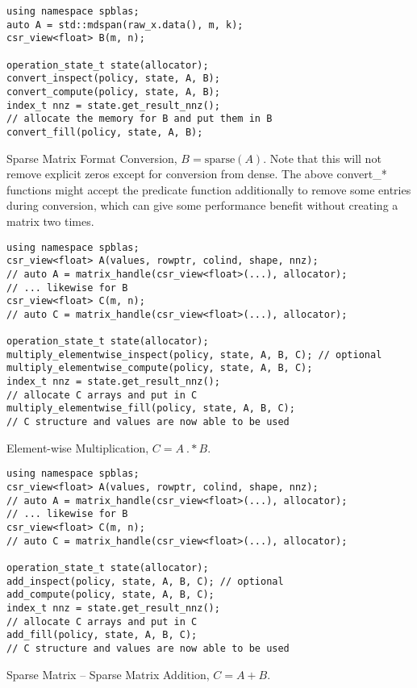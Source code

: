 \documentclass{article}
\begin{document}
\begin{listing}[H]
\begin{verbatim}
using namespace spblas;
auto A = std::mdspan(raw_x.data(), m, k);
csr_view<float> B(m, n);

operation_state_t state(allocator);
convert_inspect(policy, state, A, B);
convert_compute(policy, state, A, B);
index_t nnz = state.get_result_nnz();
// allocate the memory for B and put them in B
convert_fill(policy, state, A, B); 
\end{verbatim}
\caption{Sparse Matrix Format Conversion, $B = \text{sparse}(A)$. Note that this will not remove explicit zeros except for conversion from dense. The above convert\_* functions might accept the predicate function additionally to remove some entries during conversion, which can give some performance benefit without creating a matrix two times.}
\end{listing}



\begin{listing}[H]
\begin{verbatim}
using namespace spblas;
csr_view<float> A(values, rowptr, colind, shape, nnz);
// auto A = matrix_handle(csr_view<float>(...), allocator);
// ... likewise for B
csr_view<float> C(m, n);
// auto C = matrix_handle(csr_view<float>(...), allocator);

operation_state_t state(allocator);
multiply_elementwise_inspect(policy, state, A, B, C); // optional
multiply_elementwise_compute(policy, state, A, B, C);
index_t nnz = state.get_result_nnz();
// allocate C arrays and put in C
multiply_elementwise_fill(policy, state, A, B, C);
// C structure and values are now able to be used
\end{verbatim}
\caption{Element-wise Multiplication, $C = A~.*B$.}
\end{listing}


\begin{listing}[H]
\begin{verbatim}
using namespace spblas;
csr_view<float> A(values, rowptr, colind, shape, nnz);
// auto A = matrix_handle(csr_view<float>(...), allocator);
// ... likewise for B
csr_view<float> C(m, n);
// auto C = matrix_handle(csr_view<float>(...), allocator);

operation_state_t state(allocator);
add_inspect(policy, state, A, B, C); // optional
add_compute(policy, state, A, B, C);
index_t nnz = state.get_result_nnz();
// allocate C arrays and put in C
add_fill(policy, state, A, B, C);
// C structure and values are now able to be used
\end{verbatim}
\caption{Sparse Matrix -- Sparse Matrix Addition, $C = A + B$.}
\end{listing}
\end{document}
